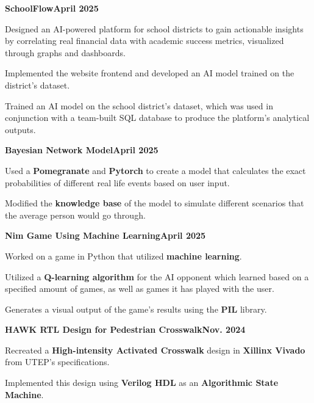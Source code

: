 \documentclass[letterpaper,10pt]{article}
\newcommand{\heading}[2]{
  \hspace{10pt}#1\hfill#2\\
}
\newcommand{\headingBf}[2]{
  \heading{\textbf{#1}}{\textbf{#2}}
}
\newenvironment{resume_list}{
  \vspace{-7pt}
  \begin{itemize}[itemsep=-2px, parsep=1pt, leftmargin=30pt]
}{
  \end{itemize}
}
\begin{document}
\vspace{0pt}
\headingBf{\large{SchoolFlow}}{April 2025}
\begin{resume_list}
  \vspace{2pt}
    \item Designed an AI-powered platform for school districts to gain actionable insights by correlating real financial data with academic success metrics, visualized through graphs and dashboards.
    \vspace{1pt}
    \item Implemented the website frontend and developed an AI model trained on the district's dataset.
    \item Trained an AI model on the school district's dataset, which was used in conjunction with a team-built SQL database to produce the platform's analytical outputs.
\end{resume_list}

\vspace{0pt}
\headingBf{\large{Bayesian Network Model}}{April 2025}
\begin{resume_list}
  \vspace{2pt}
    \item Used a \textbf{Pomegranate} and \textbf{Pytorch} to create a model that calculates the exact probabilities of different real life events based on user input.
    \vspace{1pt}
    \item Modified the \textbf{knowledge base} of the model to simulate different scenarios that the average person would go through.
\end{resume_list}

\vspace{0pt}
\headingBf{\large{Nim Game Using Machine Learning}}{April 2025}
\begin{resume_list}
  \item Worked on a game in Python that utilized \textbf{machine learning}.
  \vspace{1pt}
  \item Utilized a \textbf{Q-learning algorithm} for the AI opponent which learned based on a specified amount of games, as well as games it has played with the user.
  \vspace{1pt}
  \item Generates a visual output of the game's results using the \textbf{PIL} library.
\end{resume_list}

\vspace{0pt}
\headingBf{\large{HAWK RTL Design for Pedestrian Crosswalk}}{Nov. 2024}
\begin{resume_list}
  \item Recreated a \textbf{High-intensity Activated Crosswalk} design in \textbf{Xillinx Vivado} from UTEP's specifications.
  \vspace{1pt}
  \item Implemented this design using \textbf{Verilog HDL} as an \textbf{Algorithmic State Machine}.
\end{resume_list}
\end{document}
